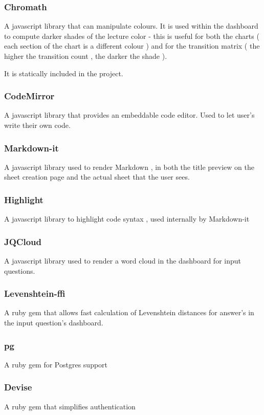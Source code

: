 \documentclass[12pt]{article}
\begin{document}
\subsubsection{Chromath} 
A javascript library that can manipulate colours. It is used within the dashboard to compute darker shades of the lecture color - this is useful for both the charts ( each section of the chart is a different colour ) and for the transition matrix ( the higher the transition count , the darker the shade ).

	It is statically included in the project.
	
\subsubsection{CodeMirror}
A javascript library that provides an embeddable code editor. Used to let user's write their own code.

\subsubsection{Markdown-it}
A javascript library used to render Markdown , in both the title preview on the sheet creation page and the actual sheet that the user sees.

\subsubsection{Highlight}
A javascript library to highlight code syntax , used internally by Markdown-it
	
\subsubsection{JQCloud}
A javascript library used to render a word cloud in the dashboard for input questions.

\subsubsection{Levenshtein-ffi}
A ruby gem that allows fast calculation of Levenshtein distances for answer's in the input question's dashboard.

\subsubsection{pg}
A ruby gem for Postgres support

\subsubsection{Devise}
A ruby gem that simplifies authentication
\end{document}
